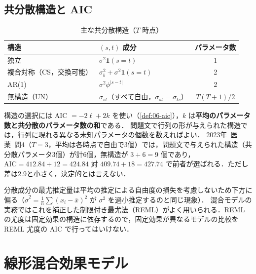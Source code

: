 \documentclass[a4paper,11pt,openany]{ltjsbook}
\newcommand{\tagbox}[2]{\tcbox[on line,boxsep=0.5pt,left=2pt,right=2pt,top=0.5pt,bottom=0.5pt,
  colframe=#1,colback=#1!10,boxrule=0.4pt,arc=1pt]{\scriptsize\bfseries\textcolor{#1}{#2}}}
\newcommand{\Hinshutsu}{\tagbox{bkorange}{頻出}}
\newcommand{\kakomon}[2]{\mbox{#1年 医薬 問#2}}
\newcommand{\ind}{\mathbf{1}}
\begin{document}
\subsection{共分散構造と AIC}\label{subsec:08-cov}
\begin{table}[htbp]
\centering\small
\caption{主な共分散構造（$T$ 時点）}\label{tab:08-cov}
\begin{tabular}{@{}lL{62mm}c@{}}
\toprule
構造 & $(s,t)$ 成分 & パラメータ数\\
\midrule
独立 & $\sigma^2\ind(s=t)$ & 1\\
複合対称（CS，交換可能） & $\sigma_b^2+\sigma^2\ind(s=t)$ & 2\\
AR(1) & $\sigma^2\phi^{|s-t|}$ & 2\\
無構造（UN） & $\sigma_{st}$（すべて自由，$\sigma_{st}=\sigma_{ts}$） & $T(T+1)/2$\\
\bottomrule
\end{tabular}
\end{table}
\Hinshutsu 構造の選択には AIC $=-2\ell+2k$ を使い（\cref{def:06-aic}），$k$ は\textbf{平均のパラメータ数と共分散のパラメータ数の和}である．
問題文で行列の形が与えられた構造では，行列に現れる異なる未知パラメータの個数を数えればよい．
\kakomon{2023}{4}（$T=3$，平均は各時点で自由で3個）では，問題文で与えられた構造（共分散パラメータ3個）が計6個，無構造が $3+6=9$ 個であり，
$\mathrm{AIC}=412.84+12=424.84$ 対 $409.74+18=427.74$ で前者が選ばれる．ただし差は2.9と小さく，決定的とは言えない．
\begin{supbox}[補足：REML]
分散成分の最尤推定量は平均の推定による自由度の損失を考慮しないため下方に偏る（$\hat\sigma^2=\frac1n\sum(x_i-\bar x)^2$ が $\sigma^2$ を過小推定するのと同じ現象）．
混合モデルの実務ではこれを補正した制限付き最尤法（REML）がよく用いられる．REML の尤度は固定効果の構造に依存するので，固定効果が異なるモデルの比較を REML 尤度の AIC で行ってはいけない．
\end{supbox}

\section{線形混合効果モデル}\label{sec:08-lmm}
\end{document}
